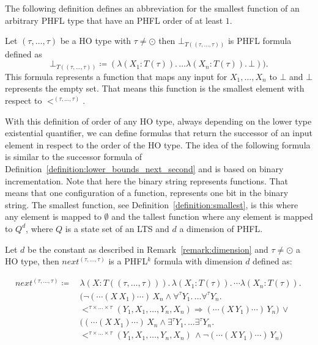 The following definition defines an abbreviation for the smallest function of an arbitrary PHFL type that have an PHFL order of at least $1$.

\begin{definition} 
\label{definition:smallest}
	Let $(\tau, \dots, \tau)$ be a HO type with $\tau \neq \odot$ then $\bot_{T((\tau, \dots, \tau))}$ is PHFL formula defined as
	\[\bot_{T((\tau, \dots, \tau))} \coloneqq (\lambda (X_1 \colon T(\tau)).\, \dots \lambda (X_n \colon T(\tau)).\,\bot)).\] 
    This formula represents a function that maps any input for $X_1, \dots, X_n$ to $\bot$ and $\bot$ 
    represents the empty set. That means this function is the smallest element with respect to $<^{(\tau, \dots, \tau)}$.
\end{definition}

With this definition of order of any HO type, always depending on the lower type existential quantifier, we can define
formulas that return the successor of an input element in respect to the order of the HO type. The idea of the
following formula is similar to the successor formula of Definition~\ref{definition:lower_bounds_next_second} and is
based on binary incrementation. Note that here the binary string represents functions. That means that one configuration of a function, represents one bit in the binary string. The smallest function, see Definition~\ref{definition:smallest}, is this where any element is mapped to $\emptyset$ and the tallest function where any element is mapped to $Q^d$, where $Q$ is a state set of an LTS and $d$ a dimension of PHFL. 

\begin{definition}
    \label{definition:lower_bounds_next_higher}
    Let $d$ be the constant as described in Remark~\ref{remark:dimension} and $\tau \neq \odot$ a
    HO type, then $next^{(\tau, \dots, \tau)}$ is a PHFL$^k$ formula with dimension $d$ defined as:

    \begin{align*}
        next^{(\tau, \dots, \tau)} \coloneqq &\,\lambda (X \colon T ((\tau, \dots, \tau))).\,\lambda (X_1 \colon T(\tau)).\, \dotsb \lambda (X_n \colon T(\tau)).\, \\&\,
        \big(\neg (\dotsb(X\,X_1)\dotsb)\,X_n \wedge \forall^{\tau}Y_1.\, \dots \forall^{\tau}Y_n.\,\\&\,<^{\tau \times
        \dots \times \tau}(Y_1, X_1, \dots, Y_n, X_n) \Rightarrow  (\dotsb(X\,Y_1)\dotsb)\,Y_n\big) \,\vee
        \\&\,\big((\dotsb (X\,X_1) \dotsb)\,X_n \wedge \exists^{\tau}Y_1.\, \dots \exists^{\tau}Y_n.\, \\&\,
        <^{\tau \times \dots \times \tau}
        (Y_1, X_1, \dots, Y_n, X_n)\,\wedge \neg (\dotsb(X\,Y_1)\dotsb)\,Y_n\big)
    \end{align*}
\end{definition}

